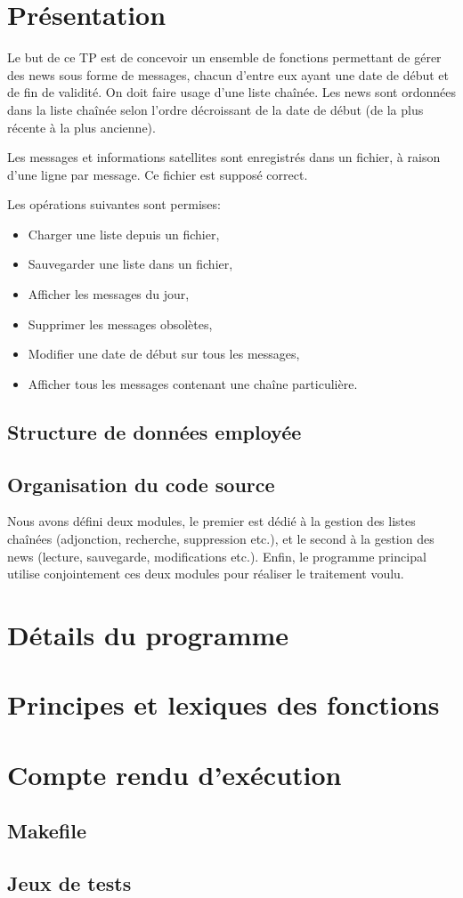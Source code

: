 \documentclass{report}
\begin{document}
  
  \setlength{\parskip}{10pt}
  \setlength{\parindent}{0pt}
  \chapter{Présentation}
    Le but de ce TP est de concevoir un ensemble de fonctions permettant de gérer des news sous forme de messages, chacun d'entre eux ayant une date de début et de fin de validité. On doit faire usage d'une liste chaînée. Les news sont ordonnées dans la liste chaînée selon l'ordre décroissant de la date de début (de la plus récente à la plus ancienne).

    Les messages et informations satellites sont enregistrés dans un fichier, à raison d'une ligne par message. Ce fichier est supposé correct.

    Les opérations suivantes sont permises:
    \begin{itemize}
      \item Charger une liste depuis un fichier,
      \item Sauvegarder une liste dans un fichier,
      \item Afficher les messages du jour,
      \item Supprimer les messages obsolètes,
      \item Modifier une date de début sur tous les messages,
      \item Afficher tous les messages contenant une chaîne particulière.
    \end{itemize}

    \section{Structure de données employée}
      
    \section{Organisation du code source}
      Nous avons défini deux modules, le premier est dédié à la gestion des listes chaînées (adjonction, recherche, suppression etc.), et le second à la gestion des news (lecture, sauvegarde, modifications etc.). Enfin, le programme principal utilise conjointement ces deux modules pour réaliser le traitement voulu.
      
  \chapter{Détails du programme}
    

 \chapter{Principes et lexiques des fonctions}
    

  \chapter{Compte rendu d'exécution}
    \section{Makefile}

    \section{Jeux de tests}
      
\end{document}
